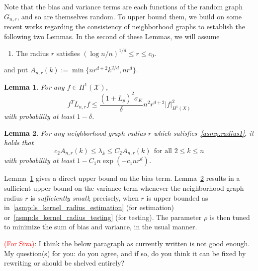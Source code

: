 \documentclass[twoside]{article}
\newcommand{\1}{\mathbf{1}}
\newcommand{\Lap}{L}
\newcommand{\Xset}{\mathcal{X}}
\newtheorem{lemma}{Lemma}
\theoremstyle{definition}
\theoremstyle{remark}
\begin{document}
Note that the bias and variance terms are each functions of the random graph $G_{n,r}$, and so are themselves random. To upper bound them, we build on some recent works \citep{burago2014,trillos2019,calder2019} regarding the consistency of neighborhood graphs to establish the following two Lemmas. In the second of these Lemmas, we will assume
\begin{enumerate}[label=(R\arabic*)]
	\item
	\label{asmp:radius1}
	The radius $r$ satisfies $(\log n/n)^{1/d} \leq r \leq c_0$.
\end{enumerate}
and put $A_{n,r}(k) := \min\{nr^{d + 2}k^{2/d},nr^d\}$.

\begin{lemma}
	\label{lem:graph_sobolev_seminorm}
	For any $f \in H^1(\Xset)$, 
	\begin{equation}
	\label{eqn:graph_sobolev_seminorm}
	f^T \Lap_{n,r} f \leq \frac{(1 + L_p)^2 \sigma_K}{\delta} n^2 r^{d + 2} |f|_{H^1(X)}^2
	\end{equation}
	with probability at least $1 - \delta$.
\end{lemma}
\begin{lemma}
	\label{lem:neighborhood_eigenvalue}
	For any neighborhood graph radius $r$ which satisfies~\ref{asmp:radius1}, it holds that
	\begin{equation}
	\label{eqn:neighborhood_eigenvalue}
	c_2A_{n,r}(k) \leq \lambda_k \leq C_2A_{n,r}(k)~~\textrm{for all $2 \leq k \leq n$}
	\end{equation}
	with probability at least $1 - C_1n\exp(-c_1nr^d)$.
\end{lemma}
Lemma~\ref{lem:graph_sobolev_seminorm} gives a direct upper bound on the bias term. Lemma~\ref{lem:neighborhood_eigenvalue} results in a sufficient upper bound on the variance term whenever the neighborhood graph radius $r$ is \textit{sufficiently small}; precisely, when $r$ is upper bounded as in~\ref{asmp:ls_kernel_radius_estimation} (for estimation) or~\ref{asmp:ls_kernel_radius_testing} (for testing). The parameter $\rho$ is then tuned to minimize the sum of bias and variance, in the usual manner.

\textcolor{red}{(For Siva)}: I think the below paragraph as currently written is not good enough. My question(s) for you: do you agree, and if so, do you think it can be fixed by rewriting or should be shelved entirely?
\end{document}
